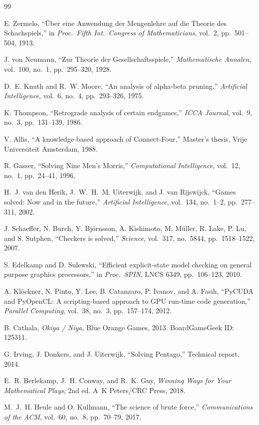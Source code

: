\documentclass[11pt,a4paper]{article}
\begin{document}
\begin{thebibliography}{99}

E. Zermelo,
``\"Uber eine Anwendung der Mengenlehre auf die Theorie des Schachspiels,''
in \emph{Proc.\ Fifth Int.\ Congress of Mathematicians}, vol.~2,
pp.~501--504, 1913.

J. von Neumann,
``Zur Theorie der Gesellschaftsspiele,''
\emph{Mathematische Annalen}, vol.~100, no.~1, pp.~295--320, 1928.

D.~E. Knuth and R.~W. Moore,
``An analysis of alpha-beta pruning,''
\emph{Artificial Intelligence}, vol.~6, no.~4, pp.~293--326, 1975.

K. Thompson,
``Retrograde analysis of certain endgames,''
\emph{ICCA Journal}, vol.~9, no.~3, pp.~131--139, 1986.

V. Allis,
``A knowledge-based approach of Connect-Four,''
Master's thesis, Vrije Universiteit Amsterdam, 1988.

R. Gasser,
``Solving Nine Men's Morris,''
\emph{Computational Intelligence}, vol.~12, no.~1, pp.~24--41, 1996.

H.~J. van den Herik, J.~W.~H.~M. Uiterwijk, and J. van Rijswijck,
``Games solved: Now and in the future,''
\emph{Artificial Intelligence}, vol.~134, no.~1--2, pp.~277--311, 2002.

J. Schaeffer, N. Burch, Y. Bj\"ornsson, A. Kishimoto, M. M\"uller,
R. Lake, P. Lu, and S. Sutphen,
``Checkers is solved,''
\emph{Science}, vol.~317, no.~5844, pp.~1518--1522, 2007.

S. Edelkamp and D. Sulewski,
``Efficient explicit-state model checking on general purpose graphics
processors,''
in \emph{Proc.\ SPIN}, LNCS 6349, pp.~106--123, 2010.

A. Kl\"ockner, N. Pinto, Y. Lee, B. Catanzaro, P. Ivanov, and
A. Fasih,
``PyCUDA and PyOpenCL: A scripting-based approach to GPU run-time code
generation,''
\emph{Parallel Computing}, vol.~38, no.~3, pp.~157--174, 2012.

B. Cathala,
\emph{Okiya / Niya},
Blue Orange Games, 2013.
BoardGameGeek ID: 125311.

G. Irving, J. Donkers, and J. Uiterwijk,
``Solving Pentago,''
Technical report, 2014.

E.~R. Berlekamp, J.~H. Conway, and R.~K. Guy,
\emph{Winning Ways for Your Mathematical Plays}, 2nd ed.
A~K Peters/CRC Press, 2018.

M.~J.~H. Heule and O. Kullmann,
``The science of brute force,''
\emph{Communications of the ACM}, vol.~60, no.~8, pp.~70--79, 2017.

\end{thebibliography}
\end{document}
